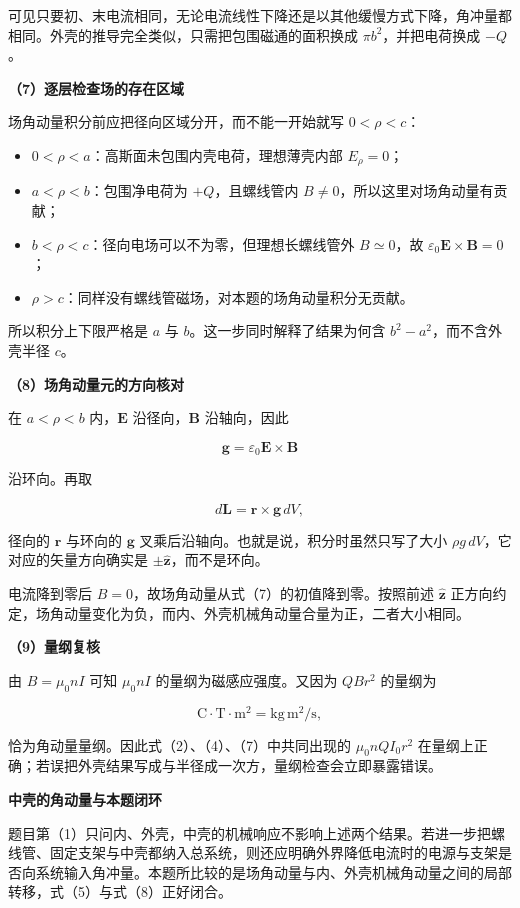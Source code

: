 \documentclass[12pt,a4paper,UTF8]{ctexart}
\newcommand{\tightlist}{\setlength{\itemsep}{0pt}\setlength{\parskip}{0pt}}
\begin{document}
可见只要初、末电流相同，无论电流线性下降还是以其他缓慢方式下降，角冲量都相同。外壳的推导完全类似，只需把包围磁通的面积换成
\(\pi b^2\)，并把电荷换成 \(-Q\)。

\textbf{（7）逐层检查场的存在区域}

场角动量积分前应把径向区域分开，而不能一开始就写 \(0<\rho<c\)：

\begin{itemize}
\tightlist
\item
  \(0<\rho<a\)：高斯面未包围内壳电荷，理想薄壳内部 \(E_\rho=0\)；
\item
  \(a<\rho<b\)：包围净电荷为 \(+Q\)，且螺线管内
  \(B\ne0\)，所以这里对场角动量有贡献；
\item
  \(b<\rho<c\)：径向电场可以不为零，但理想长螺线管外 \(B\simeq0\)，故
  \(\varepsilon_0\bm E\times\bm B=0\)；
\item
  \(\rho>c\)：同样没有螺线管磁场，对本题的场角动量积分无贡献。
\end{itemize}

所以积分上下限严格是 \(a\) 与 \(b\)。这一步同时解释了结果为何含
\(b^2-a^2\)，而不含外壳半径 \(c\)。

\textbf{（8）场角动量元的方向核对}

在 \(a<\rho<b\) 内，\(\bm E\) 沿径向，\(\bm B\) 沿轴向，因此

\[
\bm g=\varepsilon_0\bm E\times\bm B
\]

沿环向。再取

\[
d\bm L=\bm r\times\bm g\,dV,
\]

径向的 \(\bm r\) 与环向的 \(\bm g\)
叉乘后沿轴向。也就是说，积分时虽然只写了大小
\(\rho g\,dV\)，它对应的矢量方向确实是 \(\pm\hat{\bm z}\)，而不是环向。

电流降到零后 \(B=0\)，故场角动量从式（7）的初值降到零。按照前述
\(\hat{\bm z}\)
正方向约定，场角动量变化为负，而内、外壳机械角动量合量为正，二者大小相同。

\textbf{（9）量纲复核}

由 \(B=\mu_0nI\) 可知 \(\mu_0nI\) 的量纲为磁感应强度。又因为 \(QB r^2\)
的量纲为

\[
\mathrm C\cdot\mathrm T\cdot\mathrm{m^2}
=\mathrm{kg\,m^2/s},
\]

恰为角动量量纲。因此式（2）、（4）、（7）中共同出现的 \(\mu_0nQI_0r^2\)
在量纲上正确；若误把外壳结果写成与半径成一次方，量纲检查会立即暴露错误。

\textbf{中壳的角动量与本题闭环}

题目第（1）只问内、外壳，中壳的机械响应不影响上述两个结果。若进一步把螺线管、固定支架与中壳都纳入总系统，则还应明确外界降低电流时的电源与支架是否向系统输入角冲量。本题所比较的是场角动量与内、外壳机械角动量之间的局部转移，式（5）与式（8）正好闭合。
\end{document}
